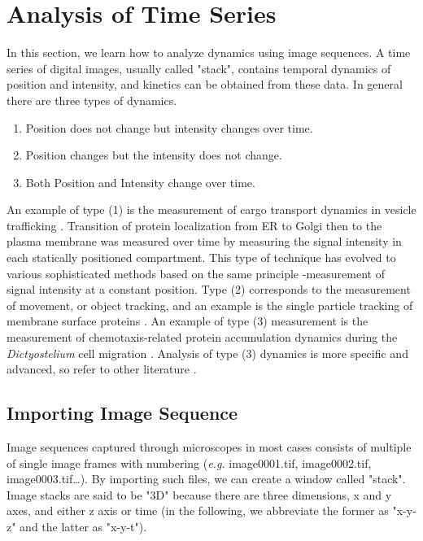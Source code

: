
\section{Analysis of Time Series }
\label{sec:timeseries}

In this section, we learn how to analyze dynamics using image sequences.
A time series of digital images, usually called
"stack", contains temporal dynamics of
position and intensity, and kinetics can be obtained from these data.
In general there are three types of dynamics.

\begin{enumerate}
\item Position does not change but intensity changes over time. 
\item Position changes but the intensity does not change. 
\item Both Position and Intensity change over time. 
\end{enumerate}

An example of type (1) is the measurement of cargo transport dynamics in
vesicle trafficking \citep{hirschbergJCB1998}. Transition of protein
localization from ER to Golgi then to the plasma membrane was measured
over time by measuring the signal intensity in each statically
positioned compartment. This type of technique has evolved to various
sophisticated methods based on the same principle -measurement of
signal intensity at a constant position. Type (2) corresponds to the
measurement of movement, or object tracking, and an example is the
single particle tracking of membrane surface proteins \citep{muraseBJ2004}. An example of type (3) measurement is the measurement of
chemotaxis-related protein accumulation dynamics during the
\textit{Dictyostelium} cell migration \citep{Dormann2002}. Analysis
of type (3) dynamics is more specific and advanced, so refer to other
literature \citep{miuraABEB2005}.

\subsection{Importing Image Sequence}

Image sequences captured through microscopes in most cases consists of multiple
of single image frames with numbering (\textit{e.g.} image0001.tif,
image0002.tif, image0003.tif\ldots). By importing such files, we can create a
window called "stack". Image stacks are said to be "3D" because there are three
dimensions, x and y axes, and either z axis or time (in the following, we
abbreviate the former as "x-y-z" and the latter as "x-y-t").

